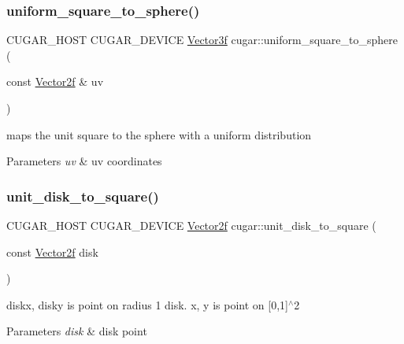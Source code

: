 \subsubsection{\texorpdfstring{uniform\+\_\+square\+\_\+to\+\_\+sphere()}{uniform\_square\_to\_sphere()}}
{\footnotesize\ttfamily C\+U\+G\+A\+R\+\_\+\+H\+O\+ST C\+U\+G\+A\+R\+\_\+\+D\+E\+V\+I\+CE \hyperlink{structcugar_1_1_vector}{Vector3f} cugar\+::uniform\+\_\+square\+\_\+to\+\_\+sphere (\begin{DoxyParamCaption}\item[{const \hyperlink{structcugar_1_1_vector}{Vector2f} \&}]{uv }\end{DoxyParamCaption})\hspace{0.3cm}{\ttfamily [inline]}}

maps the unit square to the sphere with a uniform distribution


\begin{DoxyParams}{Parameters}
{\em uv} & uv coordinates \\
\hline
\end{DoxyParams}
\mbox{\label{group__spherical__mappings_ga76c7dc3d9379efe5b51c700e28edd8a6}} 
\subsubsection{\texorpdfstring{unit\+\_\+disk\+\_\+to\+\_\+square()}{unit\_disk\_to\_square()}}
{\footnotesize\ttfamily C\+U\+G\+A\+R\+\_\+\+H\+O\+ST C\+U\+G\+A\+R\+\_\+\+D\+E\+V\+I\+CE \hyperlink{structcugar_1_1_vector}{Vector2f} cugar\+::unit\+\_\+disk\+\_\+to\+\_\+square (\begin{DoxyParamCaption}\item[{const \hyperlink{structcugar_1_1_vector}{Vector2f}}]{disk }\end{DoxyParamCaption})\hspace{0.3cm}{\ttfamily [inline]}}

diskx, disky is point on radius 1 disk. x, y is point on \mbox{[}0,1\mbox{]}$^\wedge$2


\begin{DoxyParams}{Parameters}
{\em disk} & disk point \\
\hline
\end{DoxyParams}
